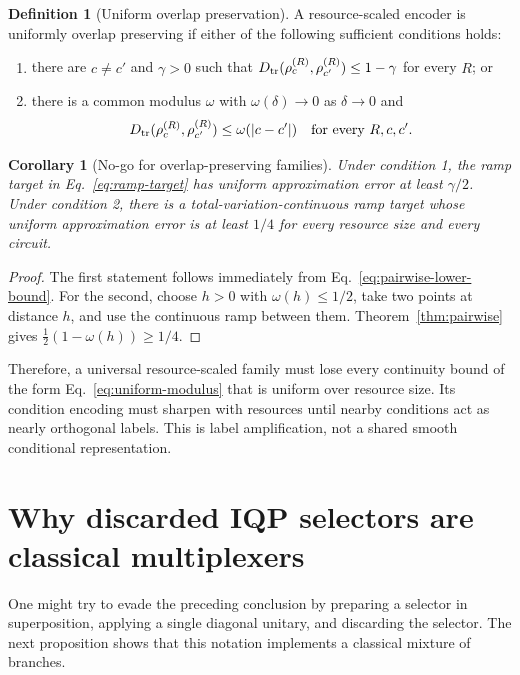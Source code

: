 \documentclass[11pt]{article}
\newtheorem{corollary}[theorem]{Corollary}
\theoremstyle{definition}
\newtheorem{definition}[theorem]{Definition}
\theoremstyle{remark}
\begin{document}
\begin{definition}[Uniform overlap preservation]
A resource-scaled encoder is uniformly overlap preserving if either of the
following sufficient conditions holds:
\begin{enumerate}
  \item there are $c\neq c'$ and $\gamma>0$ such that
  $D_{\rm tr}(\rho_c^{(R)},\rho_{c'}^{(R)})\leq1-\gamma$ for every $R$; or
  \item there is a common modulus $\omega$ with $\omega(\delta)\to0$ as
  $\delta\to0$ and
  \begin{equation}
    D_{\rm tr}(\rho_c^{(R)},\rho_{c'}^{(R)})
    \leq\omega(|c-c'|)
    \quad\text{for every }R,c,c'.
    \label{eq:uniform-modulus}
  \end{equation}
\end{enumerate}
\end{definition}

\begin{corollary}[No-go for overlap-preserving families]
\label{cor:overlap-no-go}
Under condition 1, the ramp target in Eq.~\eqref{eq:ramp-target} has uniform
approximation error at least $\gamma/2$.  Under condition 2, there is a
total-variation-continuous ramp target whose uniform approximation error is
at least $1/4$ for every resource size and every circuit.
\end{corollary}

\begin{proof}
The first statement follows immediately from
Eq.~\eqref{eq:pairwise-lower-bound}.  For the second, choose $h>0$ with
$\omega(h)\leq1/2$, take two points at distance $h$, and use the continuous
ramp between them.  Theorem~\ref{thm:pairwise} gives
$\tfrac12(1-\omega(h))\geq1/4$.
\end{proof}

Therefore, a universal resource-scaled family must lose every continuity
bound of the form Eq.~\eqref{eq:uniform-modulus} that is uniform over resource
size.  Its condition encoding must sharpen with resources until nearby conditions act as
nearly orthogonal labels.  This is label amplification, not a shared smooth
conditional representation.

\section{Why discarded IQP selectors are classical multiplexers}
\label{sec:selectors}

One might try to evade the preceding conclusion by preparing a selector in
superposition, applying a single diagonal unitary, and discarding the selector.
The next proposition shows that this notation implements a classical mixture
of branches.
\end{document}
